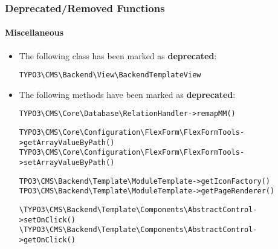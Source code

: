 %

\begin{frame}[fragile]
	\frametitle{Deprecated/Removed Functions}
	\framesubtitle{Miscellaneous}


	\begin{itemize}
		\item The following class has been marked as \textbf{deprecated}:
\begin{lstlisting}
TYPO3\CMS\Backend\View\BackendTemplateView
\end{lstlisting}
		\item The following methods have been marked as \textbf{deprecated}:
\begin{lstlisting}
TYPO3\CMS\Core\Database\RelationHandler->remapMM()
\end{lstlisting}
\vspace{-0.2cm}
\begin{lstlisting}
TYPO3\CMS\Core\Configuration\FlexForm\FlexFormTools->getArrayValueByPath()
TYPO3\CMS\Core\Configuration\FlexForm\FlexFormTools->setArrayValueByPath()
\end{lstlisting}
\vspace{-0.2cm}
\begin{lstlisting}
TPO3\CMS\Backend\Template\ModuleTemplate->getIconFactory()
TPO3\CMS\Backend\Template\ModuleTemplate->getPageRenderer()
\end{lstlisting}
\vspace{-0.2cm}
\begin{lstlisting}
\TYPO3\CMS\Backend\Template\Components\AbstractControl->setOnClick()
\TYPO3\CMS\Backend\Template\Components\AbstractControl->getOnClick()
\end{lstlisting}
	\end{itemize}

\end{frame}

